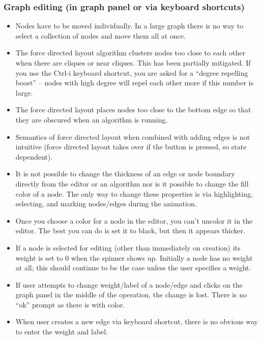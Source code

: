 \subsubsection*{Graph editing (in graph panel or via keyboard shortcuts)}

\begin{itemize}

\item Nodes have to be moved individually. In a large graph there is no way
  to select a collection of nodes and move them all at once.

\item The force directed layout algorithm clusters nodes too close to each
  other when there are cliques or near cliques. This has been partially
  mitigated. If you use the \textsf{Ctrl-i} keyboard shortcut, you are asked
  for a ``degree repelling boost'' -- nodes with high degree will repel each
  other more if this number is large.

\item The force directed layout places nodes too close to the bottom edge so
  that they are obscured when an algorithm is running.

\item Semantics of force directed layout when combined with adding edges is
  not intuitive (force directed layout takes over if the button is pressed,
  so state dependent).

\item It is not possible to change the thickness of an edge or node boundary
  directly from the editor or an algorithm nor is it possible to change the
  fill color of a node.  The only way to change these properties is via
  highlighting, selecting, and marking nodes/edges during the animation.

\item Once you choose a color for a node in the editor, you can't uncolor it in
  the editor. The best you can do is set it to black, but then it appears
  thicker.

\item If a node is selected for editing (other than immediately on creation)
  its weight is set to 0 when the spinner shows up.  Initially a node has no
  weight at all; this should continue to be the case unless the user
  specifies a weight.

\item If user attempts to change weight/label of a node/edge and clicks on
  the graph panel in the middle of the operation, the change is lost.
  There
  is no ``ok'' prompt as there is with color.

\item When user creates a new edge via keyboard shortcut, there is no obvious
  way to enter the weight and label.

\end{itemize}

